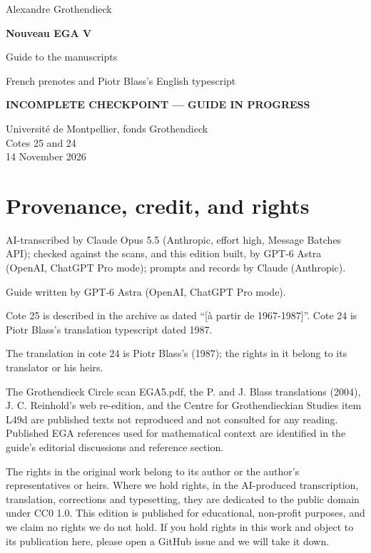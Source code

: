 \documentclass[10pt,a4paper]{article}
\begin{document}
\hypersetup{pageanchor=false}
\begin{titlepage}\thispagestyle{empty}\vspace*{20mm}
{\Large Alexandre Grothendieck\par}\vspace{12mm}
{\Huge\bfseries Nouveau EGA V\par}\vspace{8mm}
{\Large Guide to the manuscripts\par}\vspace{7mm}
{\large French prenotes and Piotr Blass's English typescript\par}\vspace{12mm}
{\large\bfseries\color{deletedred}INCOMPLETE CHECKPOINT --- GUIDE IN PROGRESS\par}\vspace{10mm}
Université de Montpellier, fonds Grothendieck\\ Cotes 25 and 24\\
14 November 2026
\vfill\end{titlepage}\clearpage\hypersetup{pageanchor=true}
\section*{Provenance, credit, and rights}
AI-transcribed by Claude Opus 5.5 (Anthropic, effort high, Message Batches API); checked against the scans, and this edition built, by GPT-6 Astra (OpenAI, ChatGPT Pro mode); prompts and records by Claude (Anthropic).

Guide written by GPT-6 Astra (OpenAI, ChatGPT Pro mode).

Cote 25 is described in the archive as dated “[à partir de 1967-1987]”. Cote 24 is Piotr Blass's translation typescript dated 1987.

The translation in cote 24 is Piotr Blass's (1987); the rights in it belong to its translator or his heirs.

The Grothendieck Circle scan EGA5.pdf, the P. and J. Blass translations (2004), J. C. Reinhold's web re-edition, and the Centre for Grothendieckian Studies item L49d are published texts not reproduced and not consulted for any reading. Published EGA references used for mathematical context are identified in the guide's editorial discussions and reference section.

The rights in the original work belong to its author or the author's representatives or heirs. Where we hold rights, in the AI-produced transcription, translation, corrections and typesetting, they are dedicated to the public domain under CC0 1.0. This edition is published for educational, non-profit purposes, and we claim no rights we do not hold. If you hold rights in this work and object to its publication here, please open a GitHub issue and we will take it down.
\end{document}
